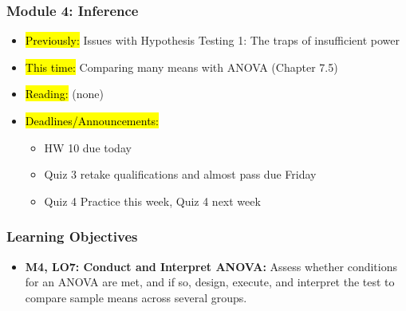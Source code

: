
\begin{frame}
    \frametitle{Module 4: Inference}
    \begin{itemize}
        \item \hl{Previously: }Issues with Hypothesis Testing 1: The traps of insufficient power
        \item \hl{This time: }Comparing many means with ANOVA (Chapter 7.5)
        \item \hl{Reading: }(none)
        \item \hl{Deadlines/Announcements: }
        \begin{itemize}
            \item HW 10 due today
            \item Quiz 3 retake qualifications and almost pass due Friday
            \item Quiz 4 Practice this week, Quiz 4 next week
        \end{itemize}
    \end{itemize}

\end{frame}

\begin{frame}
    \frametitle{Learning Objectives}
    \begin{itemize}
        \item \textbf{M4, LO7: Conduct and Interpret ANOVA:} Assess whether conditions for an ANOVA are met, and if so, design, execute, and interpret the test to compare sample means across several groups.
    \end{itemize}
\end{frame}
